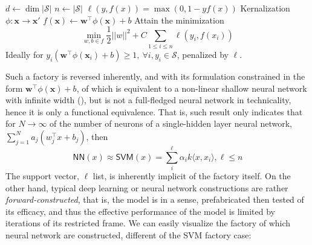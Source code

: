 \documentclass[
  journal=largetwo,
  year=2025,
  volume=37,
]{cup-journal}
\begin{document}
\begin{algorithm}[htb]
    \renewcommand{\algorithmcfname}{Factory}
    \caption{Support Vector Machine - backward construction.}
    \Begin
    {
        $d\gets \dim|\mathcal{S}|$\;
        $n\gets|\mathcal{S}|$\;
        $\ell(y,f(x))=\max(0,1-yf(x))$\;
        Kernalization $\phi:\mathbf{x}\to\mathbf{x}'$\;
        $f(\mathbf{x})\gets \mathbf{w}^{\top}\phi(\mathbf{x})+b$\;
        \Objective
        {
            Attain the minimization 
            \begin{equation}
                \min_{w,b\in f} \frac{1}{2}||w||^{2} + C \sum_{1\leq i\leq n}\ell(y_{i},f(x_{i}))
            \end{equation}
            Ideally for $y_{i}(\mathbf{w}^{\top}\phi(\mathbf{x}_i)+b)\geq 1, \: \forall i, y_{i}\in\mathcal{S}$, penalized by $\ell$.\;
        }
    }
    \label{algo:algo_SVM_no_kernel}
\end{algorithm}

Such a factory is reversed inherently, and with its formulation constrained in the form $\mathbf{w}^{\top}\phi(\mathbf{x})+b$, of which is equivalent to a non-linear shallow neural network with infinite width (\cite{wang2017research,chen2021equivalence}), but is not a full-fledged neural network in technicality, hence it is only a functional equivalence. That is, such result only indicates that for $N\to \infty$ of the number of neurons of a single-hidden layer neural network, $\sum_{j=1}^{N}a_{j}(w_{j}^{\top}x+b_{j})$, then 
\begin{equation}
    \mathsf{NN}(x) \approx \mathsf{SVM}(x) = \sum^{\ell}_{i}\alpha_{i}k\langle x,x_{i}\rangle, \ell \leq n
\end{equation}
The support vector, $\ell$ list, is inherently implicit of the factory itself. On the other hand, typical deep learning or neural network constructions are rather \textit{forward-constructed}, that is, the model is in a sense, prefabricated then tested of its efficacy, and thus the effective performance of the model is limited by iterations of its restricted frame. We can easily visualize the factory of which neural network are constructed, different of the SVM factory case:
\end{document}
